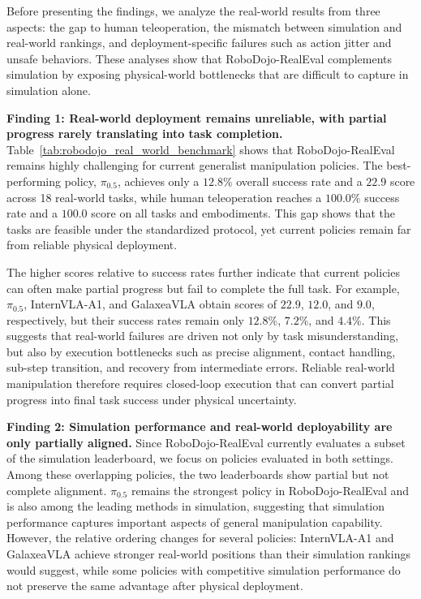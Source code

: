 Before presenting the findings, we analyze the real-world results from three aspects: the gap to human teleoperation, the mismatch between simulation and real-world rankings, and deployment-specific failures such as action jitter and unsafe behaviors. These analyses show that RoboDojo-RealEval complements simulation by exposing physical-world bottlenecks that are difficult to capture in simulation alone.

\textcolor{Blue_1}{\textbf{Finding 1: Real-world deployment remains unreliable, with partial progress rarely translating into task completion.}}
Table~\ref{tab:robodojo_real_world_benchmark} shows that RoboDojo-RealEval remains highly challenging for current generalist manipulation policies. The best-performing policy, $\pi_{0.5}$, achieves only a $12.8\%$ overall success rate and a $22.9$ score across 18 real-world tasks, while human teleoperation reaches a $100.0\%$ success rate and a $100.0$ score on all tasks and embodiments. This gap shows that the tasks are feasible under the standardized protocol, yet current policies remain far from reliable physical deployment.

The higher scores relative to success rates further indicate that current policies can often make partial progress but fail to complete the full task. For example, $\pi_{0.5}$, InternVLA-A1, and GalaxeaVLA obtain scores of $22.9$, $12.0$, and $9.0$, respectively, but their success rates remain only $12.8\%$, $7.2\%$, and $4.4\%$. This suggests that real-world failures are driven not only by task misunderstanding, but also by execution bottlenecks such as precise alignment, contact handling, sub-step transition, and recovery from intermediate errors. Reliable real-world manipulation therefore requires closed-loop execution that can convert partial progress into final task success under physical uncertainty.

\textcolor{Blue_1}{\textbf{Finding 2: Simulation performance and real-world deployability are only partially aligned.}}
Since RoboDojo-RealEval currently evaluates a subset of the simulation leaderboard, we focus on policies evaluated in both settings. Among these overlapping policies, the two leaderboards show partial but not complete alignment. $\pi_{0.5}$ remains the strongest policy in RoboDojo-RealEval and is also among the leading methods in simulation, suggesting that simulation performance captures important aspects of general manipulation capability. However, the relative ordering changes for several policies: InternVLA-A1 and GalaxeaVLA achieve stronger real-world positions than their simulation rankings would suggest, while some policies with competitive simulation performance do not preserve the same advantage after physical deployment.

